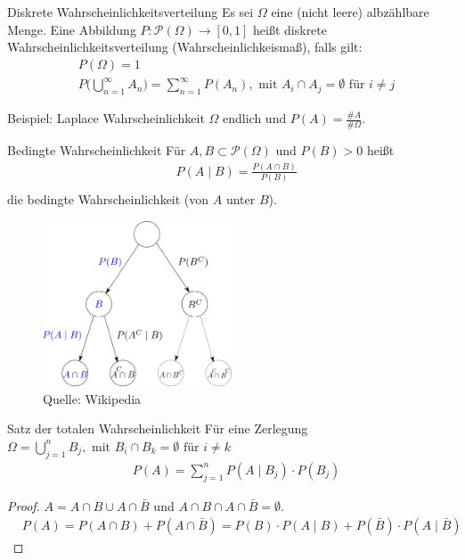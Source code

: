 \begin{Definition}{Diskrete Wahrscheinlichkeitsverteilung}
Es sei $\Omega$ eine (nicht leere) albzählbare Menge. Eine Abbildung 
$P :\mathcal{P}(\Omega) \to [0,1]$ heißt diskrete Wahrscheinlichkeitsverteilung (Wahrscheinlichkeismaß), falls gilt:
\begin{align*}
& P(\Omega) = 1\\
& P \Biggl( \bigcup_{n=1}^{\infty} A_n \biggr)= \sum_{n=1}^{\infty} P(A_n), \text{ mit } A_i \cap A_j = \emptyset \text{ für } i \neq j 
\end{align*}
\end{Definition}


\begin{Beispiel}{Beispiel: Laplace Wahrscheinlichkeit}
$\Omega$ endlich und $P(A) = \frac{\#A}{\#\Omega}$.
 \end{Beispiel}


\begin{Definition}{Bedingte  Wahrscheinlichkeit}
Für $A,B \subset \mathcal{P}(\Omega)$ und $P(B) > 0$ heißt
\begin{align*}
& P(A \; | \;  B) = \frac{P(A \cap B)}{P(B)} \\
\end{align*}
die bedingte Wahrscheinlichkeit (von $A$ unter $B$).
\end{Definition}


\begin{figure}[htp]
      \centering
    \includegraphics[width=0.5\textwidth]{images/Probability_tree}

      \caption{Quelle: Wikipedia}
\end{figure}



\begin{Satz}{Satz der totalen Wahrscheinlichkeit}
Für eine Zerlegung  $\Omega = \bigcup_{j=1}^{n} B_j, \text{ mit } B_i \cap B_k = \emptyset \text{ für } i \neq k $
\begin{align*}
& P(A ) = \sum_{j=1}^{n}  P(A \; | \;  B_j) \cdot P(B_j)
\end{align*}
\end{Satz}
\begin{proof}
$A = A \cap B \cup A \cap \bar{B}$ und  $A \cap B \cap A \cap \bar{B} = \emptyset$. 
\begin{align*}
& P(A) =  P(A \cap B) + P(A \cap \bar{B}) = P(B) \cdot P(A  \; | \; B) + P(\bar{B}) \cdot P(A  \; | \; \bar{B}) 
\end{align*}
\end{proof}

